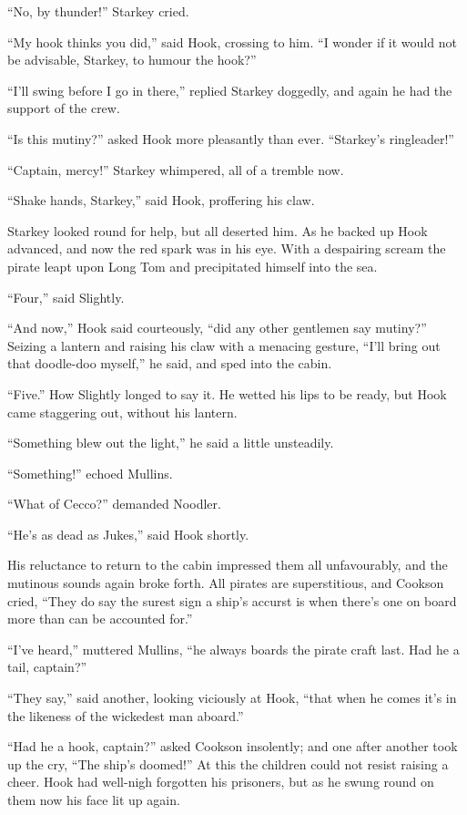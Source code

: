 ``No, by thunder!'' Starkey cried.

``My hook thinks you did,'' said Hook, crossing to him. ``I wonder if it
would not be advisable, Starkey, to humour the hook?''

``I'll swing before I go in there,'' replied Starkey doggedly, and again
he had the support of the crew.

``Is this mutiny?'' asked Hook more pleasantly than ever. ``Starkey's
ringleader!''

``Captain, mercy!'' Starkey whimpered, all of a tremble now.

``Shake hands, Starkey,'' said Hook, proffering his claw.

Starkey looked round for help, but all deserted him. As he backed up
Hook advanced, and now the red spark was in his eye. With a despairing
scream the pirate leapt upon Long Tom and precipitated himself into the
sea.

``Four,'' said Slightly.

``And now,'' Hook said courteously, ``did any other gentlemen say mutiny?''
Seizing a lantern and raising his claw with a menacing gesture, ``I'll
bring out that doodle-doo myself,'' he said, and sped into the cabin.

``Five.'' How Slightly longed to say it. He wetted his lips to be ready,
but Hook came staggering out, without his lantern.

``Something blew out the light,'' he said a little unsteadily.

``Something!'' echoed Mullins.

``What of Cecco?'' demanded Noodler.

``He's as dead as Jukes,'' said Hook shortly.

His reluctance to return to the cabin impressed them all unfavourably,
and the mutinous sounds again broke forth. All pirates are
superstitious, and Cookson cried, ``They do say the surest sign a ship's
accurst is when there's one on board more than can be accounted for.''

``I've heard,'' muttered Mullins, ``he always boards the pirate craft
last. Had he a tail, captain?''

``They say,'' said another, looking viciously at Hook, ``that when he
comes it's in the likeness of the wickedest man aboard.''

``Had he a hook, captain?'' asked Cookson insolently; and one after
another took up the cry, ``The ship's doomed!'' At this the children
could not resist raising a cheer. Hook had well-nigh forgotten his
prisoners, but as he swung round on them now his face lit up again.

